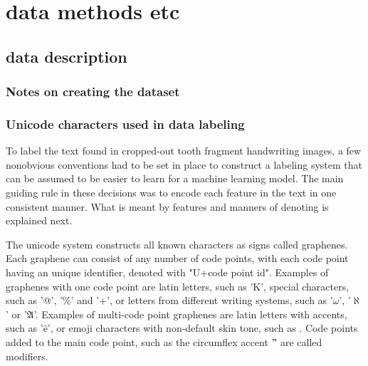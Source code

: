 \documentclass{article}
\begin{document}

\section{data methods etc}

\subsection{data description}

\subsubsection{Notes on creating the dataset}

\subsubsection{Unicode characters used in data labeling}

To label the text found in cropped-out tooth fragment handwriting images, a few nonobvious 
conventions had to be set in place to construct a labeling system that can be assumed to 
be easier to learn for a machine learning model. The main guiding rule in these decisions was 
to encode each feature in the text in one consistent manner. What is meant by features and manners 
of denoting is explained next.

The unicode system \cite{unicode_homepage} constructs all known characters as signs called graphenes.
Each graphene can consist of any number of code points, with each code point having an unique identifier, denoted with "U+code point id".
Examples of graphenes with one code point are latin letters, such as 'K', special characters, such as '@', '\%' and '+',
or letters from different writing systems, such as '$\omega$', '$\aleph$' or '$\mathfrak{A}$'.
 Examples of multi-code point graphenes 
are latin letters with accents, such as '$\hat{\text{e}}$', or emoji characters with non-default skin tone, such as {}.
Code points added to the main code point, such as the circumflex accent '\^ ' are called modifiers.
\end{document}
